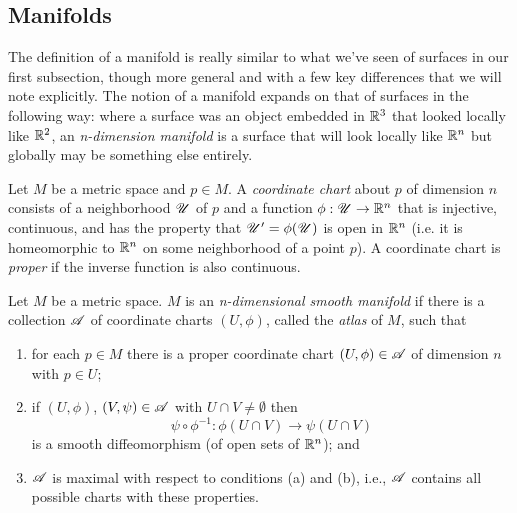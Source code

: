 \subsection{Manifolds}
  The definition of a manifold is really similar to what we've seen of surfaces in our first subsection, though more general and with a few key differences that we will note explicitly. The notion of a manifold expands on that of surfaces in the following way: where a surface was an object embedded in $\mathbb{R}^3$ that looked locally like $\mathbb{R}^2$, an \emph{n-dimension manifold} is a surface that will look locally like $\mathbb{R}^n$ but globally may be something else entirely.

  \begin{defn}
    Let $M$ be a metric space and $p \in M$. A \emph{coordinate chart} about $p$ of dimension $n$ consists of a neighborhood $\mathscr{U}$ of $p$ and a function $\phi: \mathscr{U} \to \mathbb{R}^n$ that is injective, continuous, and has the property that $\mathscr{U}^\prime = \phi(\mathscr{U})$ is open in $\mathbb{R}^n$ (i.e. it is homeomorphic to $\mathbb{R}^n$ on some neighborhood of a point $p$). A coordinate chart is \emph{proper} if the inverse function is also continuous.
  \end{defn}


  \begin{defn}
    Let $M$ be a metric space. $M$ is an \emph{n-dimensional smooth manifold} if there is a collection $\mathscr{A}$ of coordinate charts $(U, \phi)$, called the \emph{atlas} of $M$, such that
    \begin{enumerate}
      \item for each $p \in M$ there is a proper coordinate chart $(U, \phi) \in \mathscr{A}$ of dimension $n$ with $p \in U$;

      \item if $(U, \phi)$, $(V, \psi) \in \mathscr{A}$ with $U \cap V \neq \emptyset$ then
      \[
        \psi \circ \phi^{-1}:\phi(U \cap V) \to \psi(U \cap V)
      \]
      is a smooth diffeomorphism (of open sets of $\mathbb{R}^n$); and

      \item $\mathscr{A}$ is maximal with respect to conditions (a) and (b), i.e., $\mathscr{A}$ contains all possible charts with these properties. 
    \end{enumerate}
  \end{defn}

